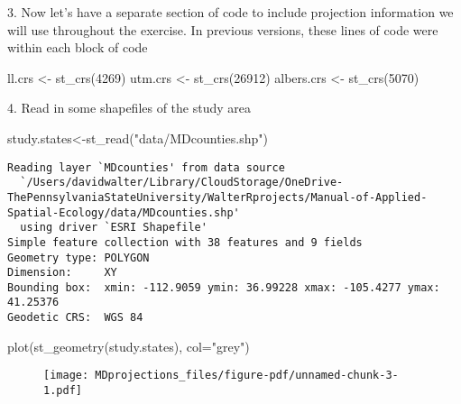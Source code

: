 \documentclass[
  letterpaper,
]{book}
\newenvironment{Shaded}{\begin{snugshade}}{\end{snugshade}}
\newcommand{\AttributeTok}[1]{\textcolor[rgb]{0.40,0.45,0.13}{#1}}
\newcommand{\DecValTok}[1]{\textcolor[rgb]{0.68,0.00,0.00}{#1}}
\newcommand{\FunctionTok}[1]{\textcolor[rgb]{0.28,0.35,0.67}{#1}}
\newcommand{\NormalTok}[1]{\textcolor[rgb]{0.00,0.23,0.31}{#1}}
\newcommand{\OtherTok}[1]{\textcolor[rgb]{0.00,0.23,0.31}{#1}}
\newcommand{\StringTok}[1]{\textcolor[rgb]{0.13,0.47,0.30}{#1}}
\begin{document}
3. Now let's have a separate section of code to include projection
information we will use throughout the exercise. In previous versions,
these lines of code were within each block of code

\begin{Shaded}
\begin{Highlighting}[]
\NormalTok{ll.crs }\OtherTok{\textless{}{-}} \FunctionTok{st\_crs}\NormalTok{(}\DecValTok{4269}\NormalTok{)}
\NormalTok{utm.crs }\OtherTok{\textless{}{-}} \FunctionTok{st\_crs}\NormalTok{(}\DecValTok{26912}\NormalTok{)}
\NormalTok{albers.crs }\OtherTok{\textless{}{-}} \FunctionTok{st\_crs}\NormalTok{(}\DecValTok{5070}\NormalTok{)}
\end{Highlighting}
\end{Shaded}

4. Read in some shapefiles of the study area

\begin{Shaded}
\begin{Highlighting}[]
\NormalTok{study.states}\OtherTok{\textless{}{-}}\FunctionTok{st\_read}\NormalTok{(}\StringTok{"data/MDcounties.shp"}\NormalTok{)}
\end{Highlighting}
\end{Shaded}

\begin{verbatim}
Reading layer `MDcounties' from data source 
  `/Users/davidwalter/Library/CloudStorage/OneDrive-ThePennsylvaniaStateUniversity/WalterRprojects/Manual-of-Applied-Spatial-Ecology/data/MDcounties.shp' 
  using driver `ESRI Shapefile'
Simple feature collection with 38 features and 9 fields
Geometry type: POLYGON
Dimension:     XY
Bounding box:  xmin: -112.9059 ymin: 36.99228 xmax: -105.4277 ymax: 41.25376
Geodetic CRS:  WGS 84
\end{verbatim}

\begin{Shaded}
\begin{Highlighting}[]
\FunctionTok{plot}\NormalTok{(}\FunctionTok{st\_geometry}\NormalTok{(study.states), }\AttributeTok{col=}\StringTok{"grey"}\NormalTok{)}
\end{Highlighting}
\end{Shaded}

\begin{figure}[H]

{\centering \texttt{[image: MDprojections\_files/figure-pdf/unnamed-chunk-3-1.pdf]}

}

\end{figure}
\end{document}
